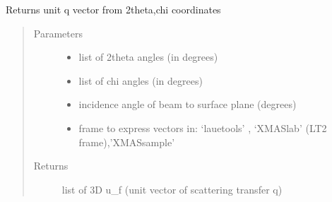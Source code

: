 \documentclass[letterpaper,10pt,english]{sphinxmanual}
\begin{document}
\begin{fulllineitems}
\label{\detokenize{Simulation_Module:LaueTools.LaueGeometry.unit_q}}
Returns unit q vector from 2theta,chi coordinates
\begin{quote}\begin{description}
\item[{Parameters}] \leavevmode\begin{itemize}
\item {} 
 \textendash{} list of 2theta angles (in degrees)

\item {} 
 \textendash{} list of chi angles (in degrees)

\item {} 
 \textendash{} incidence angle of beam to surface plane (degrees)

\item {} 
 \textendash{} frame to express vectors in: ‘lauetools’ , ‘XMASlab’ (LT2 frame),’XMASsample’

\end{itemize}

\item[{Returns}] \leavevmode
list of 3D u\_f (unit vector of scattering transfer q)

\end{description}\end{quote}

\end{fulllineitems}

\end{document}
